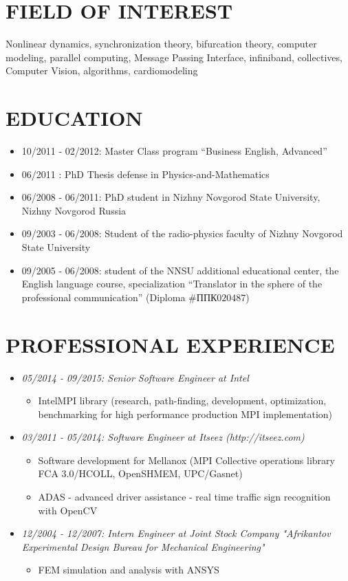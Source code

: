 \documentclass[line,margin,12pt]{res}
\begin{document}
\begin{resume}

\section{FIELD OF INTEREST}
Nonlinear dynamics, synchronization theory, bifurcation theory, computer
modeling, parallel computing, Message Passing Interface, infiniband, collectives,
Computer Vision, algorithms, cardiomodeling

\section{EDUCATION} {}
\begin{itemize}
\item 10/2011 - 02/2012: Master Class program “Business English, Advanced”
\item 06/2011          : PhD Thesis defense in Physics-and-Mathematics
\item 06/2008 - 06/2011: PhD student in Nizhny Novgorod State University, Nizhny Novgorod Russia
\item 09/2003 - 06/2008: Student of the radio-physics faculty of Nizhny Novgorod State University
\item 09/2005 - 06/2008: student of the NNSU additional educational center, the English language course, specialization “Translator in the sphere of the professional communication” (Diploma $\#ППК 020487$)
\end{itemize}


\section{PROFESSIONAL EXPERIENCE} {}
\begin{itemize}
\item
{\sl 05/2014 - 09/2015: Senior Software Engineer at Intel}
\begin{itemize}
\item IntelMPI library (research, path-finding, development, optimization, benchmarking for high performance production MPI implementation)
\end{itemize}
\item
{\sl 03/2011 - 05/2014: Software Engineer at Itseez (http://itseez.com) }
\begin {itemize}
\item Software development for Mellanox (MPI Collective operations library FCA 3.0/HCOLL, OpenSHMEM, UPC/Gasnet)
\item ADAS - advanced driver assistance - real time traffic sign recognition with OpenCV
\end{itemize}
\item
{\sl 12/2004 - 12/2007: Intern Engineer at Joint Stock Company "Afrikantov Experimental Design Bureau for Mechanical Engineering"}
\begin{itemize}
\item FEM simulation and analysis with ANSYS
\end{itemize}
\end{itemize}



\end{resume}
\end{document}
